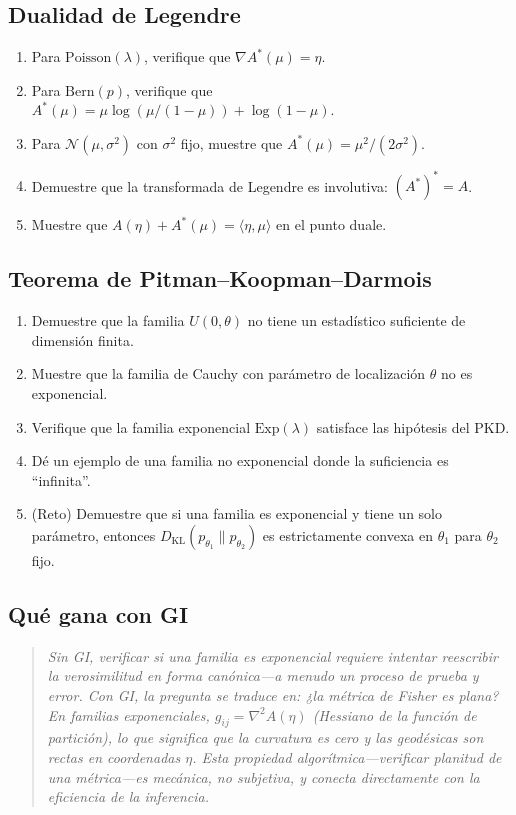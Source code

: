 \subsection*{Dualidad de Legendre}
\begin{enumerate}[resume]
	\item[$\star\star$] Para $\mathrm{Poisson}(\lambda)$, verifique que $\nabla A^*(\mu) = \eta$.
	\item[$\star\star$] Para $\mathrm{Bern}(p)$, verifique que $A^*(\mu) = \mu\log(\mu/(1-\mu)) + \log(1-\mu)$.
	\item[$\star\star\star$] Para $\mathcal{N}(\mu, \sigma^2)$ con $\sigma^2$ fijo, muestre que $A^*(\mu) = \mu^2/(2\sigma^2)$.
	\item[$\star\star\star$] Demuestre que la transformada de Legendre es involutiva: $(A^*)^* = A$.
	\item[$\star\star\star$] Muestre que $A(\eta) + A^*(\mu) = \langle \eta, \mu \rangle$ en el punto duale.
\end{enumerate}

\subsection*{Teorema de Pitman--Koopman--Darmois}
\begin{enumerate}[resume]
	\item[$\star\star\star$] Demuestre que la familia $U(0, \theta)$ no tiene un estadístico suficiente de dimensión finita.
	\item[$\star\star\star$] Muestre que la familia de Cauchy con parámetro de localización $\theta$ no es exponencial.
	\item[$\star\star$] Verifique que la familia exponencial $\mathrm{Exp}(\lambda)$ satisface las hipótesis del PKD.
	\item[$\star\star$] Dé un ejemplo de una familia no exponencial donde la suficiencia es ``infinita''.
	\item[$\star\star\star\star$] (Reto) Demuestre que si una familia es exponencial y tiene un solo parámetro, entonces $D_{\mathrm{KL}}(p_{\theta_1} \| p_{\theta_2})$ es estrictamente convexa en $\theta_1$ para $\theta_2$ fijo.
\end{enumerate}

\subsection*{Qué gana con GI}
\begin{quote}
	\itshape
	Sin GI, verificar si una familia es exponencial requiere intentar reescribir la verosimilitud en forma canónica---a menudo un proceso de prueba y error.  Con GI, la pregunta se traduce en: ¿la métrica de Fisher es plana?  En familias exponenciales, $g_{ij} = \nabla^2 A(\eta)$ (Hessiano de la función de partición), lo que significa que la curvatura es cero y las geodésicas son rectas en coordenadas $\eta$.  Esta propiedad algorítmica---verificar planitud de una métrica---es mecánica, no subjetiva, y conecta directamente con la eficiencia de la inferencia.
\end{quote}
